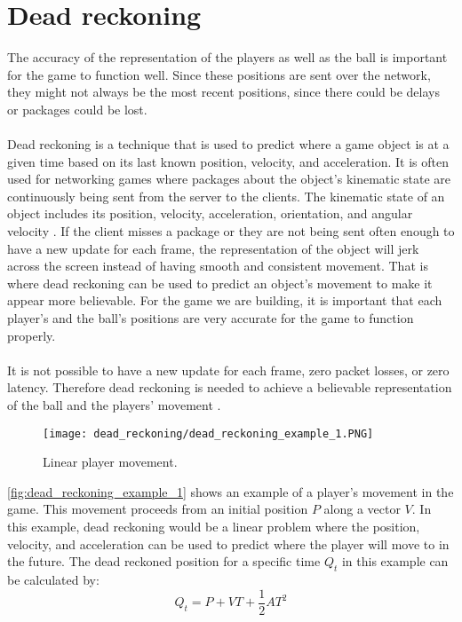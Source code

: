 \section{Dead reckoning}\label{sec:dead-reckoning}
The accuracy of the representation of the players as well as the ball is important for the game to function well.
Since these positions are sent over the network, they might not always be the most recent positions, since there could be delays or packages could be lost.
\\\\
Dead reckoning is a technique that is used to predict where a game object is at a given time based on its last known position, velocity, and acceleration.
It is often used for networking games where packages about the object's kinematic state are continuously being sent from the server to the clients.
The kinematic state of an object includes its position, velocity, acceleration, orientation, and angular velocity \cite{deadreckoning}.
If the client misses a package or they are not being sent often enough to have a new update for each frame, the representation of the object will jerk across the screen instead of having smooth and consistent movement.
That is where dead reckoning can be used to predict an object's movement to make it appear more believable.
For the game we are building, it is important that each player's and the ball's positions are very accurate for the game to function properly.
\\\\
It is not possible to have a new update for each frame, zero packet losses, or zero latency. 
Therefore dead reckoning is needed to achieve a believable representation of the ball and the players' movement \cite{deadreckoning}.
\begin{figure}[H]
    \centering
    \texttt{[image: dead\_reckoning/dead\_reckoning\_example\_1.PNG]}
    \caption{Linear player movement.}
    \label{fig:dead_reckoning_example_1}
\end{figure}
\noindent
\autoref{fig:dead_reckoning_example_1} shows an example of a player's movement in the game.
This movement proceeds from an initial position $P$ along a vector $V$.
In this example, dead reckoning would be a linear problem where the position, velocity, and acceleration can be used to predict where the player will move to in the future. 
The dead reckoned position for a specific time $Q_t$ in this example can be calculated by:
\begin{displaymath}
    Q_t = P + VT + \frac{1}{2}AT^2
\end{displaymath}
